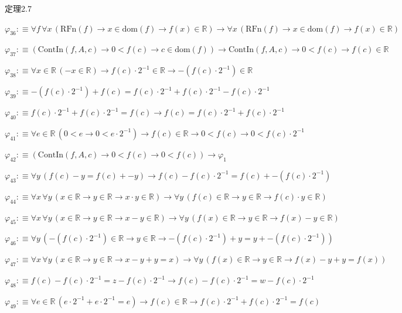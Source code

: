 \begin{fullproof}{定理2.7}
\begin{abbrevlist}
\item $\varphi_{36} :\equiv \forall f\,\forall x\,(\mathrm{RFn}(f) \to x \in \mathrm{dom}(f) \to f(x) \in \mathbb{R}) \to \forall x\,(\mathrm{RFn}(f) \to x \in \mathrm{dom}(f) \to f(x) \in \mathbb{R})$
\item $\varphi_{37} :\equiv (\mathrm{ContIn}(f,A,c) \to 0 < f(c) \to c \in \mathrm{dom}(f)) \to \mathrm{ContIn}(f,A,c) \to 0 < f(c) \to f(c) \in \mathbb{R}$
\item $\varphi_{38} :\equiv \forall x \in \mathbb{R}\,(-x \in \mathbb{R}) \to f(c) \cdot 2^{-1} \in \mathbb{R} \to -(f(c) \cdot 2^{-1}) \in \mathbb{R}$
\item $\varphi_{39} :\equiv -(f(c) \cdot 2^{-1}) + f(c) = f(c) \cdot 2^{-1} + f(c) \cdot 2^{-1} - f(c) \cdot 2^{-1}$
\item $\varphi_{40} :\equiv f(c) \cdot 2^{-1} + f(c) \cdot 2^{-1} = f(c) \to f(c) = f(c) \cdot 2^{-1} + f(c) \cdot 2^{-1}$
\item $\varphi_{41} :\equiv \forall e \in \mathbb{R}\,(0 < e \to 0 < e \cdot 2^{-1}) \to f(c) \in \mathbb{R} \to 0 < f(c) \to 0 < f(c) \cdot 2^{-1}$
\item $\varphi_{42} :\equiv (\mathrm{ContIn}(f,A,c) \to 0 < f(c) \to 0 < f(c)) \to \varphi_{1}$
\item $\varphi_{43} :\equiv \forall y\,(f(c) - y = f(c) + -y) \to f(c) - f(c) \cdot 2^{-1} = f(c) + -(f(c) \cdot 2^{-1})$
\item $\varphi_{44} :\equiv \forall x\,\forall y\,(x \in \mathbb{R} \to y \in \mathbb{R} \to x \cdot y \in \mathbb{R}) \to \forall y\,(f(c) \in \mathbb{R} \to y \in \mathbb{R} \to f(c) \cdot y \in \mathbb{R})$
\item $\varphi_{45} :\equiv \forall x\,\forall y\,(x \in \mathbb{R} \to y \in \mathbb{R} \to x - y \in \mathbb{R}) \to \forall y\,(f(x) \in \mathbb{R} \to y \in \mathbb{R} \to f(x) - y \in \mathbb{R})$
\item $\varphi_{46} :\equiv \forall y\,(-(f(c) \cdot 2^{-1}) \in \mathbb{R} \to y \in \mathbb{R} \to -(f(c) \cdot 2^{-1}) + y = y + -(f(c) \cdot 2^{-1}))$
\item $\varphi_{47} :\equiv \forall x\,\forall y\,(x \in \mathbb{R} \to y \in \mathbb{R} \to x - y + y = x) \to \forall y\,(f(x) \in \mathbb{R} \to y \in \mathbb{R} \to f(x) - y + y = f(x))$
\item $\varphi_{48} :\equiv f(c) - f(c) \cdot 2^{-1} = z - f(c) \cdot 2^{-1} \to f(c) - f(c) \cdot 2^{-1} = w - f(c) \cdot 2^{-1}$
\item $\varphi_{49} :\equiv \forall e \in \mathbb{R}\,(e \cdot 2^{-1} + e \cdot 2^{-1} = e) \to f(c) \in \mathbb{R} \to f(c) \cdot 2^{-1} + f(c) \cdot 2^{-1} = f(c)$

\end{abbrevlist}
\end{fullproof}
